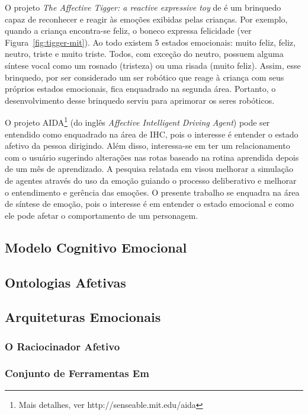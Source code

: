 O projeto \emph{The Affective Tigger: a reactive expressive toy} de
\citet{kirsch1999affective} é um brinquedo capaz de reconhecer e reagir às
emoções exibidas pelas crianças. Por exemplo, quando a criança encontra-se
feliz, o boneco expressa felicidade (ver Figura~\ref{fig:tigger-mit}). Ao todo
existem 5 estados emocionais: muito feliz, feliz, neutro, triste e muito
triste. Todos, com exceção do neutro, possuem alguma síntese vocal como um
rosnado (tristeza) ou uma risada (muito feliz). Assim, esse brinquedo, por ser
considerado um ser robótico que reage à criança com seus próprios estados
emocionais, fica enquadrado na segunda área.  Portanto, o desenvolvimento
desse brinquedo serviu para aprimorar os seres robóticos.

O projeto AIDA\footnote{Mais detalhes, ver http://senseable.mit.edu/aida} (do
inglês \emph{Affective Intelligent Driving Agent}) pode ser entendido como
enquadrado na área de IHC, pois o interesse é entender o estado afetivo da
pessoa dirigindo. Além disso, interessa-se em ter um relacionamento com o
usuário sugerindo alterações nas rotas baseado na rotina aprendida depois de
um mês de aprendizado.  A pesquisa relatada em \citet{dias-agents} visou
melhorar a simulação de agentes através do uso da emoção guiando o processo
deliberativo e melhorar o entendimento e gerência das emoções.  O presente
trabalho se enquadra na área de síntese de emoção, pois o interesse é em
entender o estado emocional e como ele pode afetar o comportamento de um
personagem.

\subsection{Modelo Cognitivo Emocional} %
\subsection{Ontologias Afetivas} %
\subsection{Arquiteturas Emocionais} %
\subsubsection{O Raciocinador Afetivo} %
\subsubsection{Conjunto de Ferramentas Em} %
